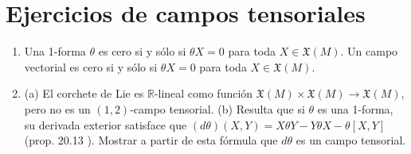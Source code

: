 \documentclass[spanish]{book}
\theoremstyle{definition}
\newcommand{\R}{\mathbb{R}}
\newcommand{\X}{\mathfrak{X}}
\begin{document}
	\section{Ejercicios de campos tensoriales}
	\begin{enumerate}
		\item Una 1-forma $\theta$ es cero si y sólo si $\theta X=0$ para toda $X\in\X(M)$. Un campo vectorial es cero si y sólo si $\theta X=0$ para toda $X\in\X(M)$.
		\item (a) El corchete de Lie es $\R$-lineal como función $\X(M)\times\X(M)\to\X(M)$, pero no es un $(1,2)$-campo tensorial. (b) Resulta que si $\theta$ es una 1-forma, su derivada exterior satisface que $(d\theta)(X,Y)=X\theta Y-Y\theta X-\theta[X,Y]$ (prop. 20.13 \cite{Loring}). Mostrar a partir de esta fórmula que $d\theta$ es un campo tensorial.
	\end{enumerate}
\end{document}
